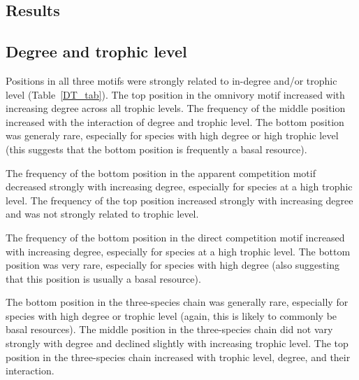 \documentclass[12pt]{article}
\begin{document}
\begin{spacing}{2.0}
        
    \subsection*{Results}
        \subsection*{Degree and trophic level}
    
            Positions in all three motifs were strongly related to in-degree and/or trophic level (Table~\ref{DT_tab}).
            The top position in the omnivory motif increased with increasing degree across all trophic levels.
            The frequency of the middle position increased with the interaction of degree and trophic level.
            The bottom position was generaly rare, especially for species with high degree or high trophic level (this suggests that the bottom position is frequently a basal resource).
            
            
            The frequency of the bottom position in the apparent competition motif decreased strongly with increasing degree, especially for species at a high trophic level.
            The frequency of the top position increased strongly with increasing degree and was not strongly related to trophic level.
            
            
            The frequency of the bottom position in the direct competition motif increased with increasing degree, especially for species at a high trophic level.
            The bottom position was very rare, especially for species with high degree (also suggesting that this position is usually a basal resource).
            
            
            The bottom position in the three-species chain was generally rare, especially for species with high degree or trophic level (again, this is likely to commonly be basal resources).
            The middle position in the three-species chain did not vary strongly with degree and declined slightly with increasing trophic level.
            The top position in the three-species chain increased with trophic level, degree, and their interaction.
    

\end{spacing}
\end{document}
